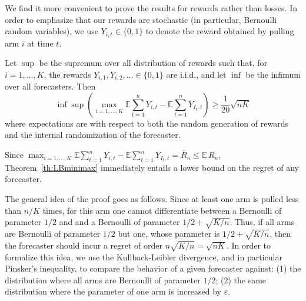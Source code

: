 \documentclass[11pt]{hackednow}
\newcommand{\E}{\mathbb{E}}
\newcommand{\oR}{\overline{R}}
\renewcommand{\epsilon}{\varepsilon}
\begin{document}
We find it more convenient to prove the results for rewards rather than losses. In order to emphasize that our rewards are stochastic (in particular, Bernoulli random variables), we use $Y_{i,t}\in\{0,1\}$ to denote the reward obtained by pulling arm $i$ at time $t$.
%
\begin{theorem} \label{th:LBminimax}
Let $\sup$ be the supremum over all distribution of rewards such that, for $i=1,\dots,K$, the rewards $Y_{i,1},Y_{i,2},\ldots\in\{0,1\}$ are i.i.d., and let $\inf$ be the infimum over all forecasters. Then
\begin{equation} \label{eq:LBminimax}
\inf \sup \left(\max_{i=1,\hdots,K} \E \sum_{t=1}^n Y_{i,t} - \E \sum_{t=1}^n Y_{I_t,t} \right) \geq \frac{1}{20} \sqrt{n K}
\end{equation}
where expectations are with respect to both the random generation of rewards and the internal randomization of the forecaster.
\end{theorem}
%
Since $\max_{i=1,\hdots,K} \E \sum_{t=1}^n Y_{i,t} - \E \sum_{t=1}^n Y_{I_t,t} = \oR_n \le \E\,R_n$, Theorem~\ref{th:LBminimax} immediately entails a lower bound on the regret of any forecaster.

The general idea of the proof goes as follows. Since at least one arm is pulled less than $n/K$ times, for this arm one cannot differentiate between a Bernoulli of parameter $1/2$ and and a Bernoulli of parameter $1/2+\sqrt{K/n}$. Thus, if all arms are Bernoulli of parameter $1/2$ but one, whose parameter is $1/2+\sqrt{K/n}$, then the forecaster should incur a regret of order $n \sqrt{K/n} = \sqrt{n K}$. In order to formalize this idea, we use the Kullback-Leibler divergence, and in particular Pinsker's inequality, to compare the behavior of a given forecaster against: (1) the distribution where all arms are Bernoulli of parameter $1/2$; (2) the same distribution where the parameter of one arm is increased by $\epsilon$. 
\end{document}
